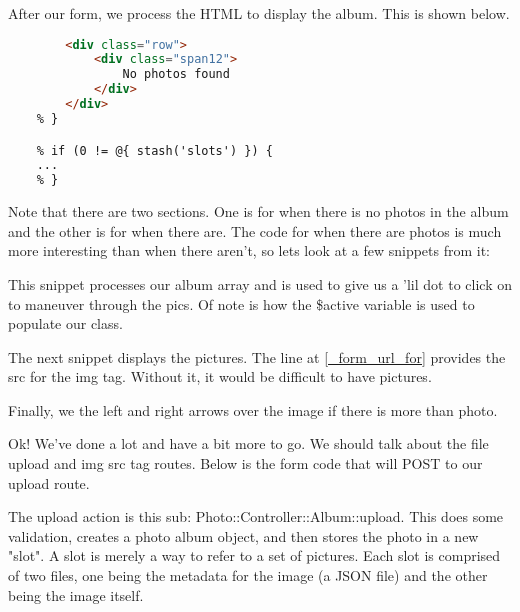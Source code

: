 \documentclass[14pt]{extreport}
\newcommand\Small{\fontsize{12}{13.0}\fontencoding{T1}\selectfont}
\newcommand*\LSTfont{\Small\ttfamily\SetTracking{encoding=*}{-60}\lsstyle}
\begin{document}
After our form, we process the HTML to display the album.  This is shown below.

\begin{lstlisting}[language=Html, style=BlockStyle]
    % if (0 == @{ stash('slots') }) {
        <div class="row">
            <div class="span12">
                No photos found
            </div>
        </div>
    % }

    % if (0 != @{ stash('slots') }) {
    ...
    % }
\end{lstlisting}

Note that there are two sections.  One is for when there is no photos in the album
and the other is for when there are.  The code for when there are photos is much
more interesting than when there aren't, so lets look at a few snippets from it:



This snippet processes our album array and is used to give us a 'lil dot to click on
to maneuver through the pics.  Of note is how the \$active variable is used to populate
our class.



The next snippet displays the pictures. The line at \ref{_form_url_for} provides the 
src for the img tag. Without it, it would be difficult to have pictures.



Finally, we the left and right arrows over the image if there is more than photo.

Ok!  We've done a lot and have a bit more to go.  We should talk about the file upload
and img src tag routes.  Below is the form code that will POST to our upload route.



The upload action is this sub: Photo::Controller::Album::upload.  This does
some validation, creates a photo album object, and then stores the photo in a
new "slot".  A slot is merely a way to refer to a set of pictures.  Each slot
is comprised of two files, one being the metadata for the image (a JSON file)
and the other being the image itself.
\end{document}

